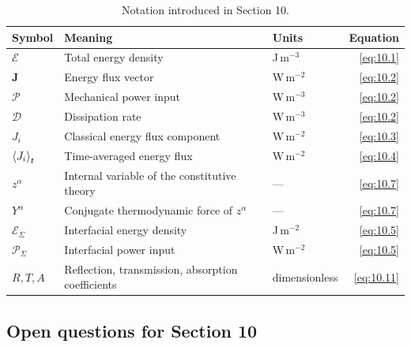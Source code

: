 \begin{table}[htbp]
\centering
\small
\caption{Notation introduced in Section 10.}
\label{tab:notation-sec10}
\begin{tabularx}{\textwidth}{@{}lXlr@{}}
\toprule
\textbf{Symbol} & \textbf{Meaning} & \textbf{Units} & \textbf{Equation} \\
\midrule
$\mathcal{E}$ & Total energy density & J\,m$^{-3}$ & \eqref{eq:10.1} \\
$\bm{J}$ & Energy flux vector & W\,m$^{-2}$ & \eqref{eq:10.2} \\
$\mathcal{P}$ & Mechanical power input & W\,m$^{-3}$ & \eqref{eq:10.2} \\
$\mathcal{D}$ & Dissipation rate & W\,m$^{-3}$ & \eqref{eq:10.2} \\
$J_i$ & Classical energy flux component & W\,m$^{-2}$ & \eqref{eq:10.3} \\
$\left\langle J_i \right\rangle_t$ & Time-averaged energy flux & W\,m$^{-2}$ & \eqref{eq:10.4} \\
$z^\alpha$ & Internal variable of the constitutive theory & --- & \eqref{eq:10.7} \\
$Y^\alpha$ & Conjugate thermodynamic force of $z^\alpha$ & --- & \eqref{eq:10.7} \\
$\mathcal{E}_\Sigma$ & Interfacial energy density & J\,m$^{-2}$ & \eqref{eq:10.5} \\
$\mathcal{P}_\Sigma$ & Interfacial power input & W\,m$^{-2}$ & \eqref{eq:10.5} \\
$R, T, A$ & Reflection, transmission, absorption coefficients & dimensionless & \eqref{eq:10.11} \\
\bottomrule
\end{tabularx}
\end{table}

\subsection{Open questions for Section 10}

